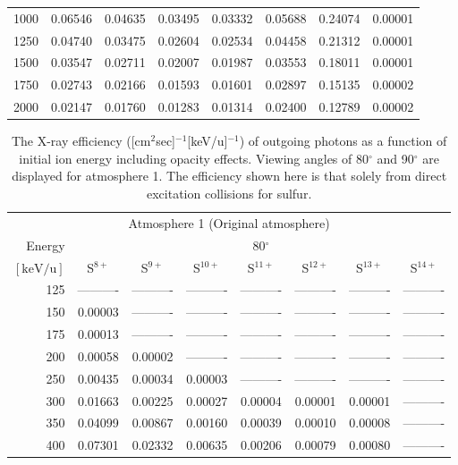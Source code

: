 \begin{table}[ht]
\begin{tabular}{r|c|c|c|c|c|c|c}
     1000 & 0.06546 & 0.04635 & 0.03495 & 0.03332 & 0.05688 & 0.24074 & 0.00001 \\
     1250 & 0.04740 & 0.03475 & 0.02604 & 0.02534 & 0.04458 & 0.21312 & 0.00001 \\
     1500 & 0.03547 & 0.02711 & 0.02007 & 0.01987 & 0.03553 & 0.18011 & 0.00001 \\
     1750 & 0.02743 & 0.02166 & 0.01593 & 0.01601 & 0.02897 & 0.15135 & 0.00002 \\
     2000 & 0.02147 & 0.01760 & 0.01283 & 0.01314 & 0.02400 & 0.12789 & 0.00002 \\ \cline{1-8}
    \end{tabular}
    \label{tab:XRayEffODE1}
\end{table}

\begin{table}[ht]
    \centering
    \caption{The X-ray efficiency ([cm$^2$sec]$^{-1}$[keV/u]$^{-1}$) of outgoing photons as a function of initial ion energy including opacity effects. Viewing angles of 80$^\circ$ and 90$^\circ$ are displayed for atmosphere 1. The efficiency shown here is that solely from direct excitation collisions for sulfur.}
    \begin{tabular}{r|c|c|c|c|c|c|c}
    \multicolumn{8}{c}{Atmosphere 1 (Original atmosphere)} \\ \cline{2-8}
    Energy & \multicolumn{7}{c}{80$^\circ$} \\ \cline{2-8}
    $\mathrm{[keV/u]}$ & S$^{8+}$ & S$^{9+}$ & S$^{10+}$ & S$^{11+}$ & S$^{12+}$ & S$^{13+}$ & S$^{14+}$ \\ \cline{1-8}
      125 & ---------- & ---------- & ---------- & ---------- & ---------- & ---------- & ---------- \\
      150 & 0.00003 & ---------- & ---------- & ---------- & ---------- & ---------- & ---------- \\
      175 & 0.00013 & ---------- & ---------- & ---------- & ---------- & ---------- & ---------- \\
      200 & 0.00058 & 0.00002 & ---------- & ---------- & ---------- & ---------- & ---------- \\
      250 & 0.00435 & 0.00034 & 0.00003 & ---------- & ---------- & ---------- & ---------- \\
      300 & 0.01663 & 0.00225 & 0.00027 & 0.00004 & 0.00001 & 0.00001 & ---------- \\
      350 & 0.04099 & 0.00867 & 0.00160 & 0.00039 & 0.00010 & 0.00008 & ---------- \\
      400 & 0.07301 & 0.02332 & 0.00635 & 0.00206 & 0.00079 & 0.00080 & ---------- \\

\end{tabular}
\end{table}
